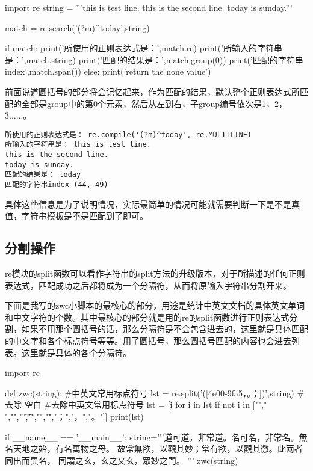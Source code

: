 \documentclass[12pt,oneside]{book}
\begin{document}
\begin{common-format}
\begin{tcbpython}[]
import re
string = '''this is test line.
this is the second line.
today is sunday.'''

match = re.search('(?m)^today',string)

if match:
    print('所使用的正则表达式是：',match.re)
    print('所输入的字符串是：',match.string)
    print('匹配的结果是：',match.group(0))
    print('匹配的字符串index',match.span())
else:
    print('return the none value')
\end{tcbpython}

前面说道圆括号的部分将会记忆起来，作为匹配的结果，默认整个正则表达式所匹配的全部是group中的第0个元素，然后从左到右，子group编号依次是1，2，3......。

\begin{Verbatim}
所使用的正则表达式是： re.compile('(?m)^today', re.MULTILINE)
所输入的字符串是： this is test line.
this is the second line.
today is sunday.
匹配的结果是： today
匹配的字符串index (44, 49)
\end{Verbatim}

具体这些信息是为了说明情况，实际最简单的情况可能就需要判断一下是不是真值，字符串模板是不是匹配到了即可。


\subsection{分割操作}
re模块的split函数可以看作字符串的split方法的升级版本，对于所描述的任何正则表达式，匹配成功之后都将成为一个分隔符，从而将原输入字符串分割开来。

下面是我写的zwc小脚本的最核心的部分，用途是统计中英文文档的具体英文单词和中文字符的个数。其中最核心的部分就是用的re的split函数进行正则表达式分割，如果不用那个圆括号的话，那么分隔符是不会包含进去的，这里就是具体匹配的中文字和各个标点符号等等。用了圆括号，那么圆括号匹配的内容也会进去列表。这里就是具体的各个分隔符。

\begin{tcbpython}[]
import re

def zwc(string):
    #中英文常用标点符号
    lst = re.split('([\u4e00-\u9fa5\s，。；])',string)
    #去除 空白
    #去除\s 中英文常用标点符号
    lst = [i for i in lst if not  i in
    [""," ","\n","\t","\r","\f","\v","；","，","。"]]
    print(lst)

if __name__ == '__main__':
    string='''道可道，非常道。名可名，非常名。無名天地之始，有名萬物之母。
    故常無欲，以觀其妙；常有欲，以觀其徼。此兩者同出而異名，
    同謂之玄，玄之又玄，眾妙之門。 '''
    zwc(string)
\end{tcbpython}


\end{common-format}
\end{document}
